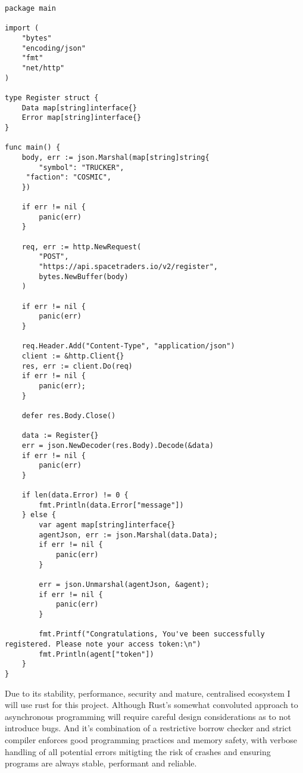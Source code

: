 \begin{lstlisting}
package main

import (
	"bytes"
	"encoding/json"
	"fmt"
	"net/http"
)

type Register struct {
    Data map[string]interface{}
    Error map[string]interface{}
}

func main() {
    body, err := json.Marshal(map[string]string{
        "symbol": "TRUCKER",
	 "faction": "COSMIC",
    }) 

    if err != nil {
        panic(err)
    }

    req, err := http.NewRequest(
        "POST",       
        "https://api.spacetraders.io/v2/register", 
        bytes.NewBuffer(body)
    )

    if err != nil {
        panic(err)
    }

    req.Header.Add("Content-Type", "application/json")
    client := &http.Client{}
    res, err := client.Do(req)
    if err != nil {
        panic(err);
    }

    defer res.Body.Close()

    data := Register{}
    err = json.NewDecoder(res.Body).Decode(&data)
    if err != nil {
        panic(err)
    }

    if len(data.Error) != 0 {
        fmt.Println(data.Error["message"])
    } else {
        var agent map[string]interface{}
        agentJson, err := json.Marshal(data.Data);
        if err != nil {
            panic(err)
        }

        err = json.Unmarshal(agentJson, &agent);
        if err != nil {
            panic(err)
        }

        fmt.Printf("Congratulations, You've been successfully registered. Please note your access token:\n")
        fmt.Println(agent["token"])
    }
}
\end{lstlisting}

Due to its stability, performance, security and mature, centralised ecosystem I will use rust for this project. Although Rust’s somewhat convoluted approach to asynchronous programming will require careful design considerations as to not introduce bugs. And it's combination of a restrictive borrow checker and strict compiler enforces good programming practices and memory safety, with verbose handling of all potential errors mitigting the risk of crashes and ensuring programs are always stable, performant and reliable. 

